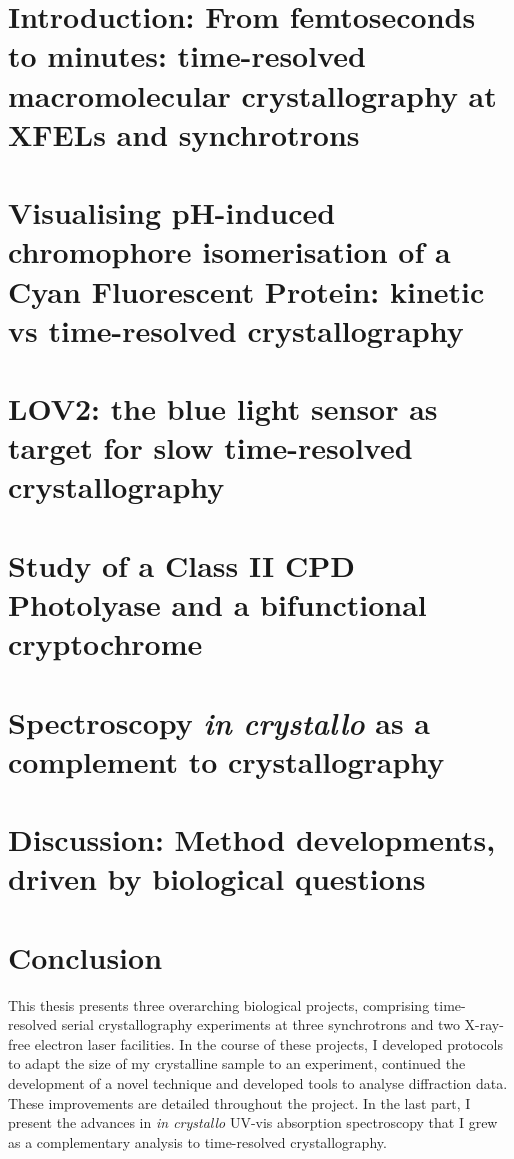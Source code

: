 \documentclass{report}
\begin{document}
\pagebreak
\part*{Introduction: From femtoseconds to minutes: time-resolved macromolecular crystallography at XFELs and synchrotrons}
    {}
\pagebreak
\part{Visualising pH-induced chromophore isomerisation of a Cyan Fluorescent Protein: kinetic vs time-resolved crystallography}\label{part:T-Cer}
	{}

\pagebreak
\part{LOV2: the blue light sensor as target for slow time-resolved crystallography}\label{part:LOV2}

	{}

\pagebreak

\part{Study of a Class II CPD Photolyase and a bifunctional cryptochrome}\label{part:Photolyase-Cryptochromes}

	{}

\pagebreak

\part{Spectroscopy \textit{in crystallo} as a complement to crystallography}\label{part:Spectro}

	{}

\pagebreak
\part*{Discussion: Method developments, driven by biological questions}
	{}

\part*{Conclusion}
This thesis presents three overarching biological projects, comprising time-resolved serial crystallography experiments at three synchrotrons and two X-ray-free electron laser facilities. In the course of these projects, I developed protocols to adapt the size of my crystalline sample to an experiment, continued the development of a novel  technique and developed tools to analyse diffraction data. These improvements are detailed throughout the project. In the last part, I present the advances in \textit{in crystallo} UV-vis absorption spectroscopy that I grew as a complementary analysis to time-resolved crystallography. 
\end{document}

